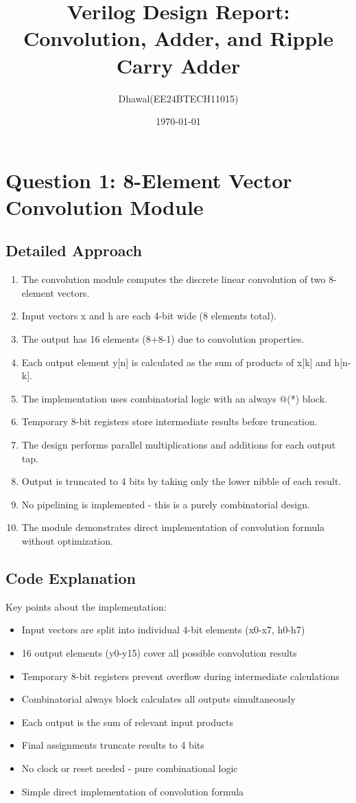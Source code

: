 \documentclass{article}
\title{Verilog Design Report: Convolution, Adder, and Ripple Carry Adder}
\author{Dhawal(EE24BTECH11015)}
\date{\today}
\begin{document}
\maketitle

\section{Question 1: 8-Element Vector Convolution Module}

\subsection{Detailed Approach}
\begin{enumerate}
    \item The convolution module computes the discrete linear convolution of two 8-element vectors.
    \item Input vectors x and h are each 4-bit wide (8 elements total).
    \item The output has 16 elements (8+8-1) due to convolution properties.
    \item Each output element y[n] is calculated as the sum of products of x[k] and h[n-k].
    \item The implementation uses combinatorial logic with an always @(*) block.
    \item Temporary 8-bit registers store intermediate results before truncation.
    \item The design performs parallel multiplications and additions for each output tap.
    \item Output is truncated to 4 bits by taking only the lower nibble of each result.
    \item No pipelining is implemented - this is a purely combinatorial design.
    \item The module demonstrates direct implementation of convolution formula without optimization.
\end{enumerate}

\subsection{Code Explanation}
Key points about the implementation:
\begin{itemize}
    \item Input vectors are split into individual 4-bit elements (x0-x7, h0-h7)
    \item 16 output elements (y0-y15) cover all possible convolution results
    \item Temporary 8-bit registers prevent overflow during intermediate calculations
    \item Combinatorial always block calculates all outputs simultaneously
    \item Each output is the sum of relevant input products
    \item Final assignments truncate results to 4 bits
    \item No clock or reset needed - pure combinational logic
    \item Simple direct implementation of convolution formula
\end{itemize}
\end{document}
